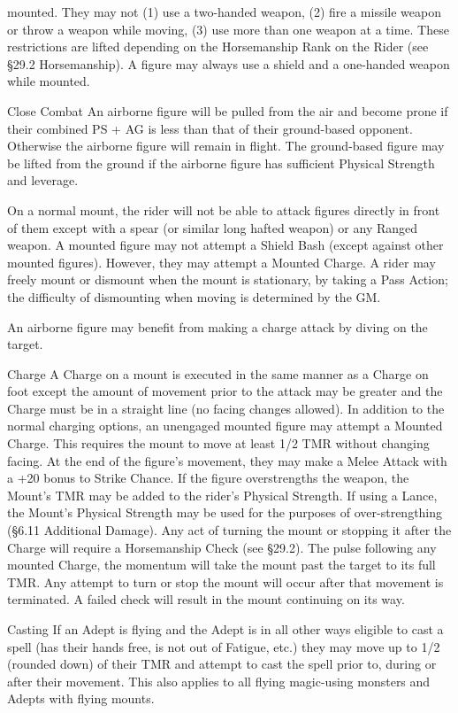 \documentclass[a4paper]{article}
\begin{document}
\begin{multicols}{3}
mounted. They may not (1) use a two-handed
weapon, (2) fire a missile weapon or throw a
weapon while moving, (3) use more than one
weapon at a time. These restrictions are lifted
depending on the Horsemanship Rank on the Rider
(see §29.2 Horsemanship). A figure may always
use a shield and a one-handed weapon while
mounted.

Close Combat
An airborne figure will be pulled from the air and
become prone if their combined PS + AG is less
than that of their ground-based opponent. Otherwise the airborne figure will remain in flight. The
ground-based figure may be lifted from the ground
if the airborne figure has sufficient Physical
Strength and leverage.

On a normal mount, the rider will not be able to
attack figures directly in front of them except with
a spear (or similar long hafted weapon) or any
Ranged weapon. A mounted figure may not attempt a Shield Bash (except against other mounted
figures). However, they may attempt a Mounted
Charge. A rider may freely mount or dismount
when the mount is stationary, by taking a Pass
Action; the difficulty of dismounting when moving
is determined by the GM.

An airborne figure may benefit from making a
charge attack by diving on the target.

Charge
A Charge on a mount is executed in the same manner as a Charge on foot except the amount of
movement prior to the attack may be greater and
the Charge must be in a straight line (no facing
changes allowed).
In addition to the normal charging options, an
unengaged mounted figure may attempt a Mounted
Charge. This requires the mount to move at least
1/2 TMR without changing facing. At the end of
the figure’s movement, they may make a Melee
Attack with a +20 bonus to Strike Chance. If the
figure overstrengths the weapon, the Mount’s TMR
may be added to the rider’s Physical Strength. If
using a Lance, the Mount’s Physical Strength may
be used for the purposes of over-strengthing (§6.11
Additional Damage).
Any act of turning the mount or stopping it after
the Charge will require a Horsemanship Check (see
§29.2). The pulse following any mounted Charge,
the momentum will take the mount past the target
to its full TMR. Any attempt to turn or stop the
mount will occur after that movement is terminated. A failed check will result in the mount continuing on its way.

Casting
If an Adept is flying and the Adept is in all other
ways eligible to cast a spell (has their hands free, is
not out of Fatigue, etc.) they may move up to 1/2
(rounded down) of their TMR and attempt to cast
the spell prior to, during or after their movement.
This also applies to all flying magic-using monsters and Adepts with flying mounts.


\end{multicols}
\end{document}
